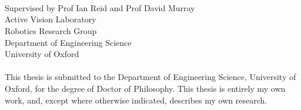 \begin{titlepage}
\begin{center}
\vspace*{1.0cm}
\Huge
{\bf \xtitle}\\
\vspace*{2.5cm}
{\Large \bf
\xauthor\\
\xcollege\\
}
\vspace*{2.5cm}
\centerline{
}
\vspace*{1.5cm}
\normalsize
Supervised by Prof Ian Reid and Prof David Murray\\
Active Vision Laboratory\\
Robotics Research Group\\
Department of Engineering Science\\
University of Oxford\\[0.5cm]
{\bf \xterm}\\

\vspace{2cm}
This thesis is submitted to the Department of Engineering Science,
University of Oxford, for the degree of Doctor of Philosophy. This
thesis is entirely my own work, and, except where otherwise indicated,
describes my own research.
\end{center}
\end{titlepage}

